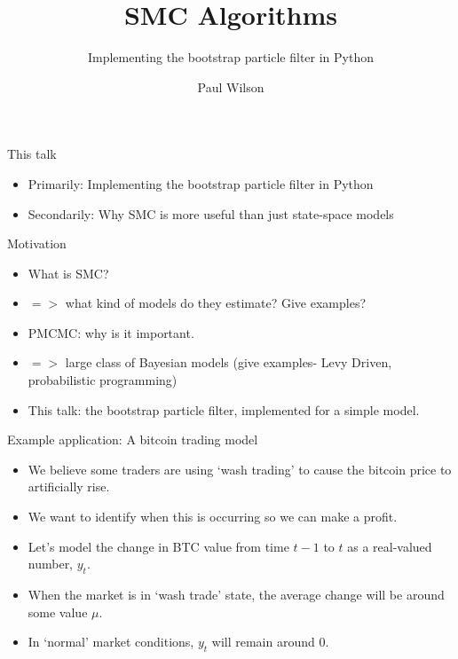 \documentclass[pdf]
{beamer}
\title{SMC Algorithms}
\subtitle{Implementing the bootstrap particle filter in Python}
\author{Paul Wilson}
\begin{document}


\begin{frame}
\titlepage
\end{frame}

\begin{frame}{This talk}
\begin{itemize}
	\item Primarily: Implementing the bootstrap particle filter in Python
	\item Secondarily: Why SMC is more useful than just state-space models
\end{itemize}
\end{frame}

\begin{frame}{Motivation}
\begin{itemize}
	\item What is SMC?
	\item $=>$ what kind of models do they estimate? Give examples?
	\item PMCMC: why is it important.
	\item $=>$ large class of Bayesian models (give examples- Levy Driven, probabilistic programming)
	\item This talk: the bootstrap particle filter, implemented for a simple model.
\end{itemize}
\end{frame}

\begin{frame}{Example application: A bitcoin trading model}

\begin{itemize}
	\item We believe some traders are using `wash trading' to cause the bitcoin price to artificially rise.
	\item We want to identify when this is occurring so we can make a profit.
	\item Let's model the change in BTC value from time $t - 1$ to $t$ as a real-valued number, $y_t$.
	\item When the market is in `wash trade' state, the average change will be around some value $\mu$.
	\item In `normal' market conditions, $y_t$ will remain around $0$.
\end{itemize}

\end{frame}
\end{document}
